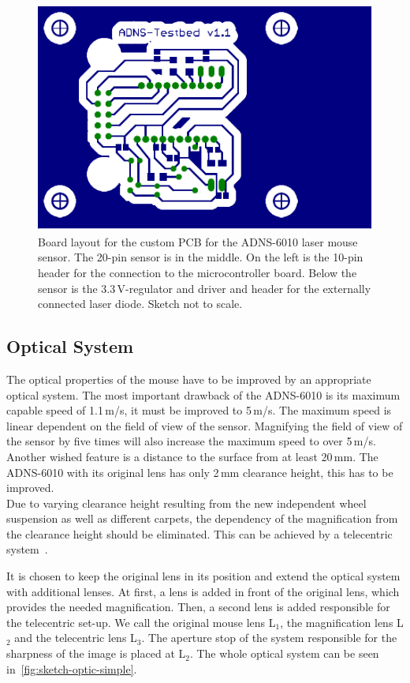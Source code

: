 \documentclass[12pt,a4paper]{article}
\begin{document}
\begin{figure}[htbp]
\begin{center}
\includegraphics[width=0.5\columnwidth]{figures/platine}
\caption{\label{fig:testplatine-board}
Board layout for the custom PCB for the ADNS-6010 laser mouse sensor.
The 20-pin sensor is in the middle.
On the left is the 10-pin header for the connection to the microcontroller board.
Below the sensor is the 3.3\,V-regulator and driver and header for the externally connected laser diode.
Sketch not to scale.
}
\end{center}
\end{figure}

\subsection{Optical System}
\label{optics}


The optical properties of the mouse have to be improved by an appropriate optical system.
The most important drawback of the ADNS-6010 is its maximum capable speed of 1.1\,m/s, it must be improved to 5\,m/s. 
The maximum speed is linear dependent on the field of view of the sensor.
Magnifying the field of view of the sensor by five times will also increase the maximum speed to over 5\,m/s.\\
Another wished feature is a distance to the surface from at least 20\,mm.
The ADNS-6010 with its original lens has only 2\,mm clearance height, this has to be improved.\\
Due to varying clearance height resulting from the new independent wheel suspension as well as different carpets, the dependency of the magnification from the clearance height should be eliminated.
This can be achieved by a telecentric system~\cite{telec}.

It is chosen to keep the original lens in its position and extend the optical system with additional lenses.
At first, a lens is added in front of the original lens, which provides the needed magnification.
Then, a second lens is added responsible for the telecentric set-up.
We call the original mouse lens L$_1$, the magnification lens L$_2$ and the telecentric lens L$_3$. 
The aperture stop of the system responsible for the sharpness of the image is placed at L$_2$.
The whole optical system can be seen in~\autoref{fig:sketch-optic-simple}.
\end{document}
